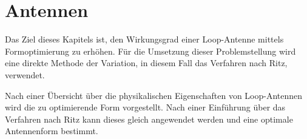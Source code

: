 %
%
%
%
\chapter{Antennen\label{chapter:antennen}}
\begin{refsection}

Das Ziel dieses Kapitels ist, den Wirkungsgrad einer Loop-Antenne mittels Formoptimierung zu erhöhen. Für die Umsetzung dieser Problemstellung wird eine direkte Methode der Variation, in diesem Fall das Verfahren nach Ritz, verwendet.

Nach einer Übersicht über die physikalischen Eigenschaften von Loop-Antennen wird die zu optimierende Form vorgestellt. Nach einer Einführung über das Verfahren nach Ritz kann dieses gleich angewendet werden und eine optimale Antennenform bestimmt.





%


\printbibliography[heading=subbibliography]
\end{refsection}
